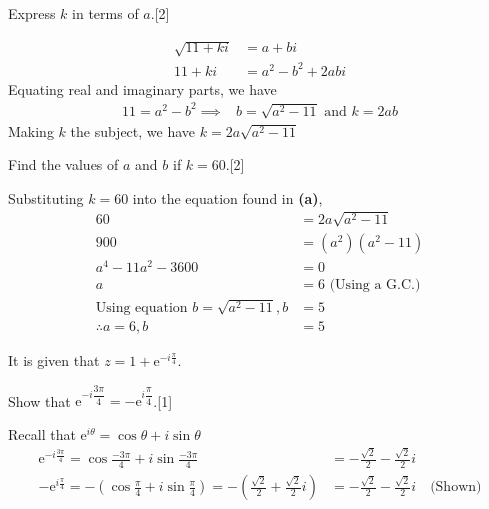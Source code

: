 \documentclass[12pt, a4 paper]{article}
\begin{document}
\begin{outline}[enumerate]
	\2 Express $k$ in terms of $a$.\hfill[2]
	\begin{answer}
		\begin{align*}
			\sqrt{11+ki} & =a+bi              \\
			11+ki        & = a^2 - b^2 + 2abi 
		\end{align*}
		Equating real and imaginary parts, we have
		\begin{align*}
			11=a^2 -b^2 \implies & b=\sqrt{a^2-11}\textrm{  and  }k=2ab 
		\end{align*}
		Making $k$ the subject, we have $k=2a\sqrt{a^2-11}$
	\end{answer}
	\2 Find the values of $a$ and $b$ if $k=60$.\hfill[2]
	\begin{answer}
		Substituting $k=60$ into the equation found in \textbf{(a)},
		\begin{align*}
			60                                         & = 2a\sqrt{a^2-11}           \\
			900                                        & = (a^2)(a^2-11)             \\
			a^4-11a^2-3600                             & = 0                         \\
			a                                          & = 6\textrm{ (Using a G.C.)} \\
			\textrm{Using equation }b=\sqrt{a^2-11}, b & =5                          \\
			\therefore a=6,b                           & =5                          
		\end{align*}
	\end{answer}        
	\1 It is given that $z=1+\mathrm{e}^{-i\frac{\pi}{4}}$. %
		    
	\2 Show that $\mathrm{e}^{-i\dfrac{3\pi}{4}}=-\mathrm{e}^{i\dfrac{\pi}{4}}$.\hfill[1]
	\begin{answer}
		Recall that $\mathrm{e}^{i\theta} = \cos\theta + i\sin\theta$
		\begin{align*}
			\mathrm{e}^{-i\frac{3\pi}{4}} = \cos\frac{-3\pi}{4} + i\sin\frac{-3\pi}{4}                                           & = -\frac{\sqrt{2}}{2}-\frac{\sqrt{2}}{2}i                       \\
			-\mathrm{e}^{i\frac{\pi}{4}} = -(\cos\frac{\pi}{4} + i\sin\frac{\pi}{4}) = -(\frac{\sqrt{2}}{2}+\frac{\sqrt{2}}{2}i) & = -\frac{\sqrt{2}}{2}-\frac{\sqrt{2}}{2}i \quad\textrm{(Shown)} 
		\end{align*}
	\end{answer}
		        

\end{outline}
\end{document}
